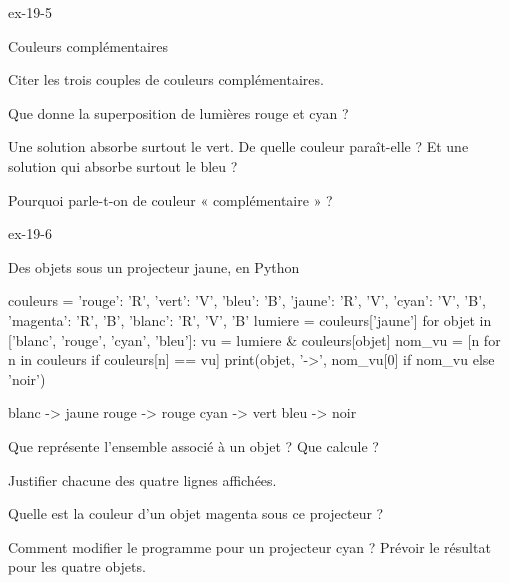 \begin{blocLivre}{ex-19-5}
\begin{exercice}[1]{Couleurs complémentaires}
\begin{questions}
\item Citer les trois couples de couleurs complémentaires.
\item Que donne la superposition de lumières rouge et cyan ?
\item Une solution absorbe surtout le vert. De quelle couleur paraît-elle ? Et une solution qui absorbe surtout le bleu ?
\item Pourquoi parle-t-on de couleur « complémentaire » ?
\end{questions}
\end{exercice}
\end{blocLivre}
\begin{blocLivre}{ex-19-6}
\begin{exercice}[2]{Des objets sous un projecteur jaune, en Python}
\begin{python}
couleurs = {'rouge': {'R'}, 'vert': {'V'}, 'bleu': {'B'},
            'jaune': {'R', 'V'}, 'cyan': {'V', 'B'}, 'magenta': {'R', 'B'},
            'blanc': {'R', 'V', 'B'}}
lumiere = couleurs['jaune']
for objet in ['blanc', 'rouge', 'cyan', 'bleu']:
    vu = lumiere & couleurs[objet]
    nom_vu = [n for n in couleurs if couleurs[n] == vu]
    print(objet, '->', nom_vu[0] if nom_vu else 'noir')
\end{python}
\begin{console}
blanc -> jaune
rouge -> rouge
cyan -> vert
bleu -> noir
\end{console}
\begin{questions}
\item {}Que représente l'ensemble associé à un objet ? Que calcule  ?
\item Justifier chacune des quatre lignes affichées.
\item Quelle est la couleur d'un objet magenta sous ce projecteur ?
\item Comment modifier le programme pour un projecteur cyan ? Prévoir le résultat pour les quatre objets.
\end{questions}
\end{exercice}
\end{blocLivre}
